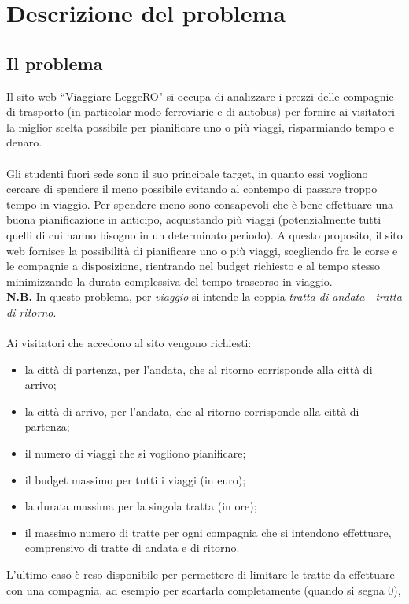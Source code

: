\documentclass[main.tex]{subfiles}
\begin{document}
\section{Descrizione del problema}
\subsection{Il problema}
Il sito web ``Viaggiare LeggeRO" si occupa di analizzare i prezzi delle compagnie di trasporto (in particolar modo ferroviarie e di autobus) per fornire
ai visitatori la miglior scelta possibile per pianificare uno o più viaggi, risparmiando tempo e denaro.\\ \\
Gli studenti fuori sede sono il suo principale target, in quanto essi vogliono cercare di spendere il meno possibile evitando al contempo di passare troppo tempo in viaggio.
Per spendere meno sono consapevoli che è bene effettuare una buona pianificazione in anticipo, acquistando più viaggi (potenzialmente tutti quelli di cui hanno bisogno in un determinato periodo).
A questo proposito, il sito web fornisce la possibilità di pianificare uno o più viaggi, scegliendo fra le corse e le compagnie a disposizione, 
rientrando nel budget richiesto e al tempo stesso minimizzando la durata complessiva del tempo trascorso in viaggio.\\
\textbf{N.B.} In questo problema, per \textit{viaggio} si intende la coppia \textit{tratta di andata} - \textit{tratta di ritorno}.\\ \\
Ai visitatori che accedono al sito vengono richiesti:
\begin{itemize}
    \item la città di partenza, per l'andata, che al ritorno corrisponde alla città di arrivo;
    \item la città di arrivo, per l'andata, che al ritorno corrisponde alla città di partenza;
    \item il numero di viaggi che si vogliono pianificare;
    \item il budget massimo per tutti i viaggi (in euro);
    \item la durata massima per la singola tratta (in ore);
    \item il massimo numero di tratte per ogni compagnia che si intendono effettuare, comprensivo di tratte di andata e di ritorno.
\end{itemize}
L'ultimo caso è reso disponibile per permettere di limitare le tratte da effettuare con una compagnia, ad esempio per scartarla completamente (quando si segna 0), 
\end{document}
